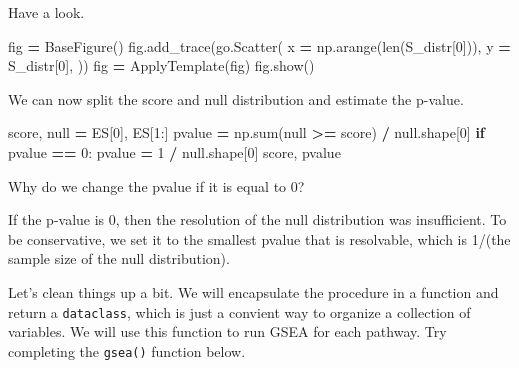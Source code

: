 \documentclass[
]{book}
\newenvironment{Shaded}{\begin{snugshade}}{\end{snugshade}}
\newcommand{\BuiltInTok}[1]{#1}
\newcommand{\ControlFlowTok}[1]{\textcolor[rgb]{0.13,0.29,0.53}{\textbf{#1}}}
\newcommand{\DecValTok}[1]{\textcolor[rgb]{0.00,0.00,0.81}{#1}}
\newcommand{\NormalTok}[1]{#1}
\newcommand{\OperatorTok}[1]{\textcolor[rgb]{0.81,0.36,0.00}{\textbf{#1}}}
\begin{document}
Have a look.

\begin{Shaded}
\begin{Highlighting}[numbers=left,,]
\NormalTok{fig }\OperatorTok{=}\NormalTok{ BaseFigure()}
\NormalTok{fig.add\_trace(go.Scatter(}
\NormalTok{    x }\OperatorTok{=}\NormalTok{ np.arange(}\BuiltInTok{len}\NormalTok{(S\_distr[}\DecValTok{0}\NormalTok{])),}
\NormalTok{    y }\OperatorTok{=}\NormalTok{ S\_distr[}\DecValTok{0}\NormalTok{],}
\NormalTok{))}
\NormalTok{fig }\OperatorTok{=}\NormalTok{ ApplyTemplate(fig)}
\NormalTok{fig.show()}
\end{Highlighting}
\end{Shaded}

We can now split the score and null distribution and estimate the p-value.

\begin{Shaded}
\begin{Highlighting}[numbers=left,,]
\NormalTok{score, null }\OperatorTok{=}\NormalTok{ ES[}\DecValTok{0}\NormalTok{], ES[}\DecValTok{1}\NormalTok{:]}
\NormalTok{pvalue }\OperatorTok{=}\NormalTok{ np.}\BuiltInTok{sum}\NormalTok{(null }\OperatorTok{\textgreater{}=}\NormalTok{ score) }\OperatorTok{/}\NormalTok{ null.shape[}\DecValTok{0}\NormalTok{]}
\ControlFlowTok{if}\NormalTok{ pvalue }\OperatorTok{==} \DecValTok{0}\NormalTok{:}
\NormalTok{    pvalue }\OperatorTok{=} \DecValTok{1} \OperatorTok{/}\NormalTok{ null.shape[}\DecValTok{0}\NormalTok{]}
\NormalTok{score, pvalue}
\end{Highlighting}
\end{Shaded}

Why do we change the pvalue if it is equal to 0?

If the p-value is 0, then the resolution of the null distribution was insufficient. To be conservative, we set it to the
smallest pvalue that is resolvable, which is 1/(the sample size of the null distribution).

Let's clean things up a bit. We will encapsulate the procedure in a function and
return a \texttt{dataclass}, which is just a convient way to organize a collection of variables.
We will use this function to run GSEA for each pathway. Try completing the \texttt{gsea()} function below.
\end{document}
